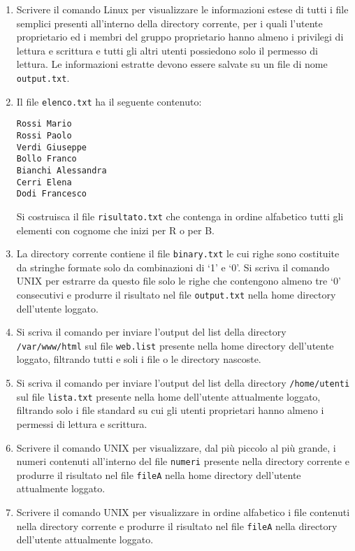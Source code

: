 \documentclass{report}
\begin{document}
\begin{enumerate}
    \item Scrivere il comando Linux per visualizzare le informazioni estese di tutti i file semplici presenti all’interno della directory corrente, per i quali l’utente proprietario ed i membri del gruppo proprietario hanno almeno i privilegi di lettura e scrittura e tutti gli altri utenti possiedono solo il permesso di lettura. Le informazioni estratte devono essere salvate su un file di nome \texttt{output.txt}.
    \newpage
    \item Il file \texttt{elenco.txt} ha il seguente contenuto:
    \begin{verbatim}
Rossi Mario
Rossi Paolo
Verdi Giuseppe
Bollo Franco
Bianchi Alessandra
Cerri Elena
Dodi Francesco
    \end{verbatim}
    Si costruisca il file \texttt{risultato.txt} che contenga in ordine alfabetico tutti gli elementi con cognome che inizi per R o per B.
    
    \item La directory corrente contiene il file \texttt{binary.txt} le cui righe sono costituite da stringhe formate solo da combinazioni di ‘1’ e ‘0’. Si scriva il comando UNIX per estrarre da questo file solo le righe che contengono almeno tre ‘0’ consecutivi e produrre il risultato nel file \texttt{output.txt} nella home directory dell’utente loggato.
    
    \item Si scriva il comando per inviare l’output del list della directory \texttt{/var/www/html} sul file \texttt{web.list} presente nella home directory dell’utente loggato, filtrando tutti e soli i file o le directory nascoste.
    
    \item Si scriva il comando per inviare l’output del list della directory \texttt{/home/utenti} sul file \texttt{lista.txt} presente nella home dell’utente attualmente loggato, filtrando solo i file standard su cui gli utenti proprietari hanno almeno i permessi di lettura e scrittura.
    
    \item Scrivere il comando UNIX per visualizzare, dal più piccolo al più grande, i numeri contenuti all’interno del file \texttt{numeri} presente nella directory corrente e produrre il risultato nel file \texttt{fileA} nella home directory dell’utente attualmente loggato.
    
    \item Scrivere il comando UNIX per visualizzare in ordine alfabetico i file contenuti nella directory corrente e produrre il risultato nel file \texttt{fileA} nella directory dell’utente attualmente loggato.


\end{enumerate}
\end{document}
